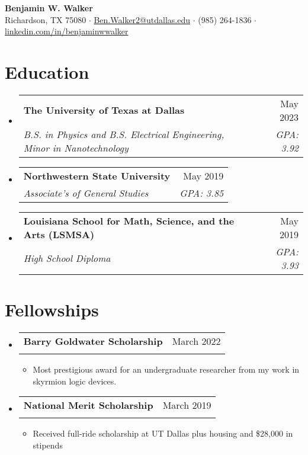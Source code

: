 \documentclass[letterpaper,11pt]{article}
\makeatletter
\newcommand{\resumeItem}[1]{
  \item\small{
    {#1 \vspace{-2pt}}
  }
}
\newcommand{\resumeSubheading}[4]{
  \vspace{-2pt}\item
    \begin{tabular*}{0.97\textwidth}[t]{l@{\extracolsep{\fill}}r}
      \textbf{#1} & #2 \\
      \textit{\small#3} & \textit{\small #4} \\
    \end{tabular*}\vspace{-7pt}
}
\newcommand{\resumeSubHeadingListStart}{\begin{itemize}[leftmargin=0.15in, label={}]}
\newcommand{\resumeSubHeadingListEnd}{\end{itemize}}
\newcommand{\resumeItemListStart}{\begin{itemize}}
\newcommand{\resumeItemListEnd}{\end{itemize}\vspace{-5pt}}
\makeatother
\begin{document}
\begin{center}
    \textbf{\Large Benjamin W. Walker} \\ \vspace{5pt}
    Richardson, TX 75080
    \hspace{1 pt} $\cdot$ \hspace{1 pt}
    \href{mailto:Ben.Walker2@utdallas.edu}{{Ben.Walker2@utdallas.edu}} 
    \hspace{1 pt} $\cdot$ \hspace{1 pt}
    (985) 264-1836
    \hspace{1 pt} $\cdot$ \hspace{1 pt}
    \href{https://www.linkedin.com/in/benjaminwwalker/}{{linkedin.com/in/benjaminwwalker}}
    \vspace{-10pt}
\end{center}

\vspace{-10pt}


\section{Education}
  \resumeSubHeadingListStart
    \resumeSubheading
      {The University of Texas at Dallas}{May 2023}
      {B.S. in Physics and B.S. Electrical Engineering, Minor in Nanotechnology}{GPA: 3.92}
    \resumeSubheading
      {Northwestern State University}{May 2019}
      {Associate's of General Studies}{GPA: 3.85}
    \resumeSubheading
    {Louisiana School for Math, Science, and the Arts \normalfont(LSMSA)}{May 2019}
    {High School Diploma}{GPA: 3.93}
  \resumeSubHeadingListEnd
\section{Fellowships}
\resumeSubHeadingListStart
      
    \resumeSubheading
      {Barry Goldwater Scholarship}{March 2022}
      {}{}
      \vspace{-18px}
      \resumeItemListStart
        \resumeItem{Most prestigious award for an undergraduate researcher from my work in skyrmion logic devices.}
      \resumeItemListEnd
    \resumeSubheading
      {National Merit Scholarship}{March 2019}
      {}{}
      \vspace{-18px}
      \resumeItemListStart
        \resumeItem{Received full-ride scholarship at UT Dallas plus housing and \$28,000 in stipends}
      \resumeItemListEnd
    \resumeSubHeadingListEnd
\vspace{-20 pt}
\end{document}
